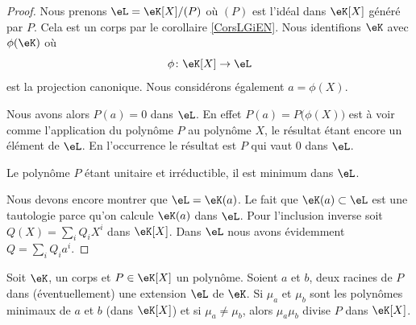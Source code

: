 \begin{proof}
    Nous prenons \( \eL=\eK[X]/(P)\) où \( (P)\) est l'idéal dans \( \eK[X]\) généré par \( P\). Cela est un corps par le corollaire \ref{CorsLGiEN}. Nous identifions \( \eK\) avec \( \phi(\eK)\) où
    \begin{equation}
        \phi\colon \eK[X]\to \eL 
    \end{equation}
    est la projection canonique. Nous considérons également \( a=\phi(X)\).

    Nous avons alors \( P(a)=0\) dans \( \eL\). En effet \( P(a)=P\big( \phi(X) \big)\) est à voir comme l'application du polynôme \( P\) au polynôme \( X\), le résultat étant encore un élément de \( \eL\). En l'occurrence le résultat est \( P\) qui vaut \( 0\) dans \( \eL\).

    Le polynôme \( P\) étant unitaire et irréductible, il est minimum dans \( \eL\).

    Nous devons encore montrer que \( \eL=\eK(a)\). Le fait que \( \eK(a)\subset \eL\) est une tautologie parce qu'on calcule \( \eK(a)\) dans \( \eL\). Pour l'inclusion inverse soit \( Q(X)=\sum_iQ_iX^i\) dans \( \eK[X]\). Dans \( \eL\) nous avons évidemment \( Q=\sum_iQ_ia^i\).
\end{proof}

\begin{proposition} \label{PropyMTEbH}
    Soit \( \eK\), un corps et \( P\in \eK[X]\) un polynôme. Soient \( a\) et \( b\), deux racines de \( P\) dans (éventuellement) une extension \( \eL\) de \( \eK\). Si \( \mu_a\) et \( \mu_b\) sont les polynômes minimaux de \( a\) et \( b\) (dans \( \eK[X]\)) et si \( \mu_a\neq \mu_b\), alors \( \mu_a\mu_b\) divise \( P\) dans \( \eK[X]\).
\end{proposition}

